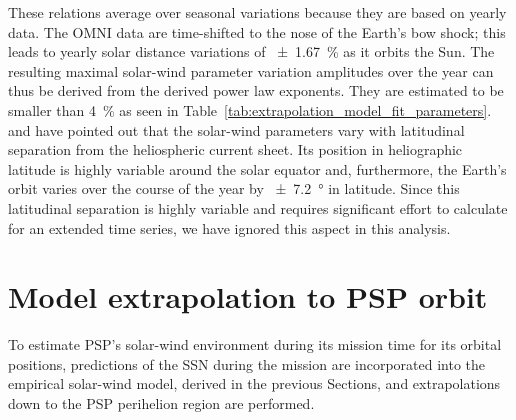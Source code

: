 \documentclass[]{aa}
\begin{document}
        These relations average over seasonal variations because they are based on yearly data. The OMNI data are time-shifted to the nose of the Earth’s bow shock; this leads to yearly solar distance variations of \SI{+-1.67}{\%} as it orbits the Sun. The resulting maximal solar-wind parameter variation amplitudes over the year can thus be derived from the derived power law exponents. They are estimated to be smaller than \SI{4}{\percent} as seen in Table~\ref{tab:extrapolation_model_fit_parameters}. \citet{Bruno1986} and \citet{Balogh1999} have pointed out that the solar-wind parameters vary with latitudinal separation from the heliospheric current sheet. Its position in heliographic latitude is highly variable around the solar equator \citep{Schwenn1990} and, furthermore, the Earth’s orbit varies over the course of the year by \SI{+-7.2}{\degree} in latitude. Since this latitudinal separation is highly variable and requires significant effort to calculate for an extended time series, we have ignored this aspect in this analysis.

        \section{Model extrapolation to PSP orbit}
        \label{sec:model_extrapolation_to_psp_orbit}
        To estimate PSP’s solar-wind environment during its mission time for its orbital positions, predictions of the SSN during the mission are incorporated into the empirical solar-wind model, derived in the previous Sections, and extrapolations down to the PSP perihelion region are performed.
\end{document}
